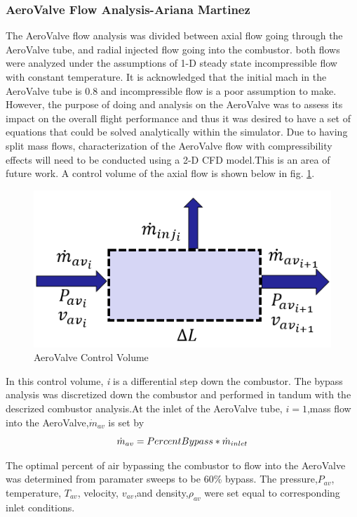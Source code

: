 \subsubsection{AeroValve Flow Analysis-Ariana Martinez}
The AeroValve flow analysis was divided between axial flow going through the AeroValve tube, and radial injected flow going into the combustor. both flows were analyzed under the assumptions of 1-D steady state incompressible flow with constant temperature. It is acknowledged that the initial mach in the AeroValve tube is 0.8 and incompressible flow is a poor assumption to make. However, the purpose of doing and analysis on the AeroValve was to assess its impact on the overall flight performance and thus it was desired to have a set of equations that could be solved analytically within the simulator. Due to having split mass flows, characterization of the AeroValve flow with compressibility effects will need to be conducted using a 2-D CFD model.This is an area of future work. A control volume of the axial flow is shown below in fig. \ref{fig:AeroValveAxialCV}.

\begin{figure}[H]
 \centering
    \includegraphics[width=0.5\linewidth]{AeroValve_Figures/AeroValveAxialCV.PNG}
    \caption{AeroValve Control Volume}
    \label{fig:AeroValveAxialCV}
\end{figure}

In this control volume, \textit{i} is a differential step down the combustor. The bypass analysis was discretized down the combustor and performed in tandum with the descrized combustor analysis.At the inlet of the AeroValve tube, \(i=1\),mass flow into the AeroValve,\(\dot{m}_{av}\) is set by
\begin{equation}
    \centering
    \dot{m}_{av}=Percent Bypass*\dot{m}_{inlet}
\end{equation}

The optimal percent of air bypassing the combustor to flow into the AeroValve was determined from paramater sweeps to be 60\% bypass. The pressure,\(P_{av}\), temperature, \(T_{av}\), velocity, \(v_{av}\),and density,\(\rho_{av}\) were set equal to corresponding inlet conditions.  


